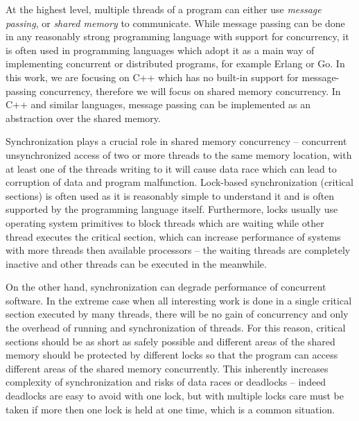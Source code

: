 At the highest level, multiple threads of a program can either use
\emph{message passing}, or \emph{shared memory} to communicate.
While message passing can be done in any reasonably strong programming language
with support for concurrency, it is often used in programming languages which
adopt it as a main way of implementing concurrent or distributed programs, for
example Erlang or Go.
In this work, we are focusing on C++ which has no built-in support for message-passing concurrency, therefore
we will focus on shared memory concurrency.
In C++ and similar languages, message passing can be implemented as an
abstraction over the shared memory.

Synchronization plays a crucial role in shared memory concurrency -- concurrent
unsynchronized access of two or more threads to the same memory location, with
at least one of the threads writing to it will cause data race which can lead
to corruption of data and program malfunction.
Lock-based synchronization (critical sections) is often used as it is
reasonably simple to understand it and is often supported by the programming
language itself.
Furthermore, locks usually use operating system primitives to block threads
which are waiting while other thread executes the critical section, which can
increase performance of systems with more threads then available processors --
the waiting threads are completely inactive and other threads can be executed
in the meanwhile.

On the other hand, synchronization can degrade performance of concurrent
software.
In the extreme case when all interesting work is done in a single critical
section executed by many threads, there will be no gain of concurrency and only
the overhead of running and synchronization of threads.
For this reason, critical sections should be as short as safely possible and
different areas of the shared memory should be protected by different locks so
that the program can access different areas of the shared memory concurrently.
This inherently increases complexity of synchronization and risks of data races
or deadlocks -- indeed deadlocks are easy to avoid with one lock, but with
multiple locks care must be taken if more then one lock is held at one time,
which is a common situation.

